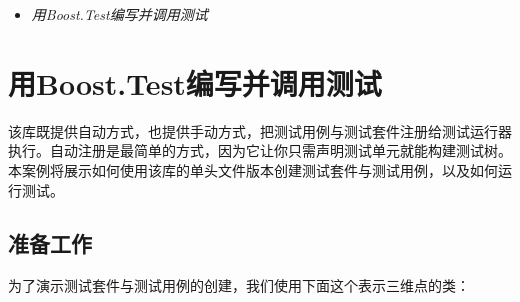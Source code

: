 
\begin{itemize}
\item \textit{用Boost.Test编写并调用测试}

\end{itemize}



\section{用Boost.Test编写并调用测试}



该库既提供自动方式，也提供手动方式，把测试用例与测试套件注册给测试运行器执行。自动注册是最简单的方式，因为它让你只需声明测试单元就能构建测试树。本案例将展示如何使用该库的单头文件版本创建测试套件与测试用例，以及如何运行测试。



\subsection{准备工作}



为了演示测试套件与测试用例的创建，我们使用下面这个表示三维点的类：



